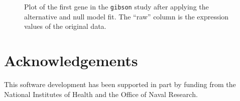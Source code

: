 \documentclass{article}\usepackage[]{graphicx}\usepackage[]{color}
\makeatletter
\newenvironment{kframe}{%
 \def\at@end@of@kframe{}%
 \ifinner\ifhmode%
  \def\at@end@of@kframe{\end{minipage}}%
  \begin{minipage}{\columnwidth}%
 \fi\fi%
 \def\FrameCommand##1{\hskip\@totalleftmargin \hskip-\fboxsep
 \colorbox{shadecolor}{##1}\hskip-\fboxsep
     \hskip-\linewidth \hskip-\@totalleftmargin \hskip\columnwidth}%
 \MakeFramed {\advance\hsize-\width
   \@totalleftmargin\z@ \linewidth\hsize
   \@setminipage}}%
 {\par\unskip\endMakeFramed%
 \at@end@of@kframe}
\newenvironment{knitrout}{}{} %
\makeatother
\begin{document}
\begin{figure}[!htbp]
 \centering
\begin{knitrout}
\color{fgcolor}\begin{kframe}


{\ttfamily\noindent\bfseries\color{errorcolor}{\#\# Error in data.frame(age = age, sex = sex, null.model = fitVals0[1, ], : arguments imply differing number of rows: 72, 46}}

{\ttfamily\noindent\bfseries\color{errorcolor}{\#\# Error: id variables not found in data: age, sex}}

{\ttfamily\noindent\bfseries\color{errorcolor}{\#\# Error: Aesthetics must either be length one, or the same length as the dataProblems:age, sex}}\end{kframe}
\end{knitrout}
\caption{Plot of the first gene in the {\tt gibson} study after applying the alternative and null model fit. The ``raw'' column is the expression values of the original data.}
\label{fig:kplotFit}
\end{figure}

\section*{Acknowledgements}
This software development has been supported in part by funding from the National Institutes of Health and the Office of Naval Research.


 
\end{document}
